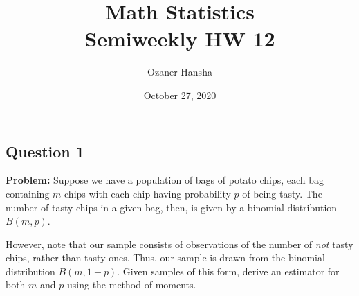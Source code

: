 \documentclass{article}
\begin{document}
\title{Math Statistics\\ Semiweekly HW 12}
\author{Ozaner Hansha}
\date{October 27, 2020}
\maketitle

\subsection*{Question 1}
\noindent\textbf{Problem:} Suppose we have a population of bags of potato chips, each bag containing $m$ chips with each chip having probability $p$ of being tasty. The number of tasty chips in a given bag, then, is given by a binomial distribution $B(m,p)$.

However, note that our sample consists of observations of the number of \textit{not} tasty chips, rather than tasty ones. Thus, our sample is drawn from the binomial distribution $B(m,1-p)$. Given samples of this form, derive an estimator for both $m$ and $p$ using the method of moments.
\bigskip
\end{document}
